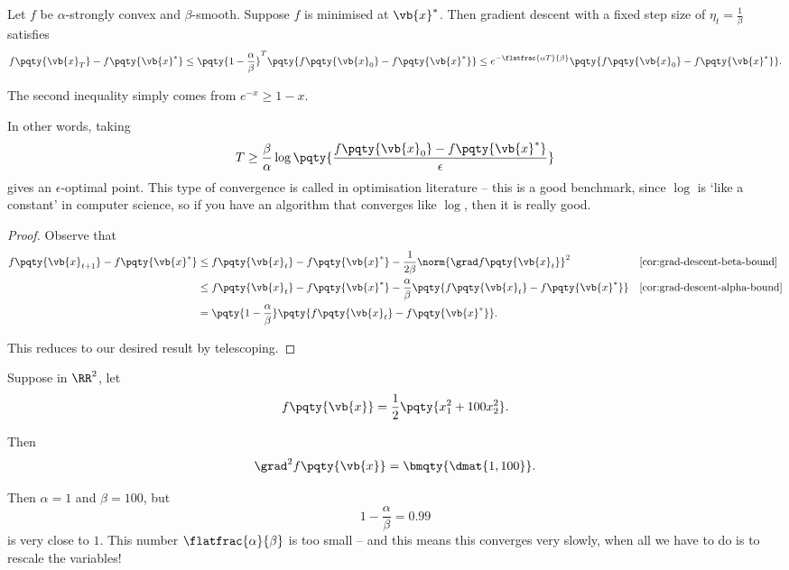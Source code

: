 \begin{theorem}
    \label{thm:exp-bound-dist-minimum}%
    Let \(f\) be \(\alpha\)-strongly convex and \(\beta\)-smooth. Suppose \(f\) is minimised at \(\vb{x}^{\ast}\). Then gradient descent with a fixed step size of \(\eta_t = \frac{1}{\beta}\) satisfies
    \[
        f\pqty{\vb{x}_T} - f\pqty{\vb{x}^{\ast}} \leq \pqty{1 - \frac{\alpha}{\beta}}^{T} \pqty{f\pqty{\vb{x}_0} - f\pqty{\vb{x}^{\ast}}} \leq e^{- \flatfrac{\alpha T}{\beta}} \pqty{f\pqty{\vb{x}_0} - f\pqty{\vb{x}^{\ast}}}.
    \]
\end{theorem}

\begin{remark}
    The second inequality simply comes from \(e^{-x} \geq 1 - x\).
\end{remark}

In other words, taking
\[
    T \geq \frac{\beta}{\alpha} \log \pqty{\frac{f\pqty{\vb{x}_0} - f\pqty{\vb{x}^{\ast}}}{\epsilon}}
\]
gives an \(\epsilon\)-optimal point. This type of convergence is called  in optimisation literature -- this is a good benchmark, since \(\log\) is `like a constant' in computer science, so if you have an algorithm that converges like \(\log\), then it is really good.

\begin{proof}
    Observe that
    \begin{align*}
        f\pqty{\vb{x}_{t + 1}} - f\pqty{\vb{x}^{\ast}} &\leq f\pqty{\vb{x}_t} - f\pqty{\vb{x}^{\ast}} - \frac{1}{2\beta} \norm{\grad f\pqty{\vb{x}_t}}^2 && \text{\autoref{cor:grad-descent-beta-bound}} \\
        &\leq f\pqty{\vb{x}_t} - f\pqty{\vb{x}^{\ast}} - \frac{\alpha}{\beta} \pqty{f\pqty{\vb{x}_t} - f\pqty{\vb{x}^{\ast}}} && \text{\autoref{cor:grad-descent-alpha-bound}} \\
        &= \pqty{1 - \frac{\alpha}{\beta}} \pqty{f\pqty{\vb{x}_t} - f\pqty{\vb{x}^{\ast}}}.
    \end{align*}

    This reduces to our desired result by telescoping.
\end{proof}

\begin{example}
    Suppose in \(\RR^2\), let
    \[
        f\pqty{\vb{x}} = \frac{1}{2} \pqty{x_1^2 + 100 x_2^2}.
    \]

    Then
    \[
        \grad^2 f\pqty{\vb{x}} = \bmqty{\dmat{1,100}}.
    \]

    Then \(\alpha = 1\) and \(\beta = 100\), but
    \[
        1 - \frac{\alpha}{\beta} = 0.99
    \]
    is very close to \(1\). This number \(\flatfrac{\alpha}{\beta}\) is too small -- and this means this converges very slowly, when all we have to do is to rescale the variables!
\end{example}

